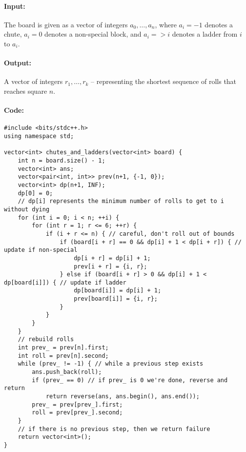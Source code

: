 \documentclass[10pt]{article}
\begin{document}
\paragraph*{Input:} 

The board is given as a vector of integers \(a_0, \ldots, a_n\), where \(a_i = -1\) denotes a chute, \(a_i = 0\) denotes a non-special block, and \(a_i = > i\) denotes a ladder from \(i\) to \(a_i\). 

\paragraph*{Output:}

A vector of integers \(r_1, \ldots, r_k\) -- representing the shortest sequence of rolls that reaches square \(n\).

\paragraph*{Code:} \hspace*{2mm}
\begin{lstlisting}
#include <bits/stdc++.h>
using namespace std;

vector<int> chutes_and_ladders(vector<int> board) {
    int n = board.size() - 1;
    vector<int> ans;
    vector<pair<int, int>> prev(n+1, {-1, 0});
    vector<int> dp(n+1, INF);
    dp[0] = 0;
    // dp[i] represents the minimum number of rolls to get to i without dying
    for (int i = 0; i < n; ++i) {
        for (int r = 1; r <= 6; ++r) {
            if (i + r <= n) { // careful, don't roll out of bounds
                if (board[i + r] == 0 && dp[i] + 1 < dp[i + r]) { // update if non-special
                    dp[i + r] = dp[i] + 1;
                    prev[i + r] = {i, r};
                } else if (board[i + r] > 0 && dp[i] + 1 < dp[board[i]]) { // update if ladder
                    dp[board[i]] = dp[i] + 1;
                    prev[board[i]] = {i, r};
                }
            }
        }
    }
    // rebuild rolls
    int prev_ = prev[n].first;
    int roll = prev[n].second;
    while (prev_ != -1) { // while a previous step exists
        ans.push_back(roll);
        if (prev_ == 0) // if prev_ is 0 we're done, reverse and return 
            return reverse(ans, ans.begin(), ans.end());
        prev_ = prev[prev_].first;
        roll = prev[prev_].second;
    }
    // if there is no previous step, then we return failure
    return vector<int>();
}
\end{lstlisting}
\end{document}
